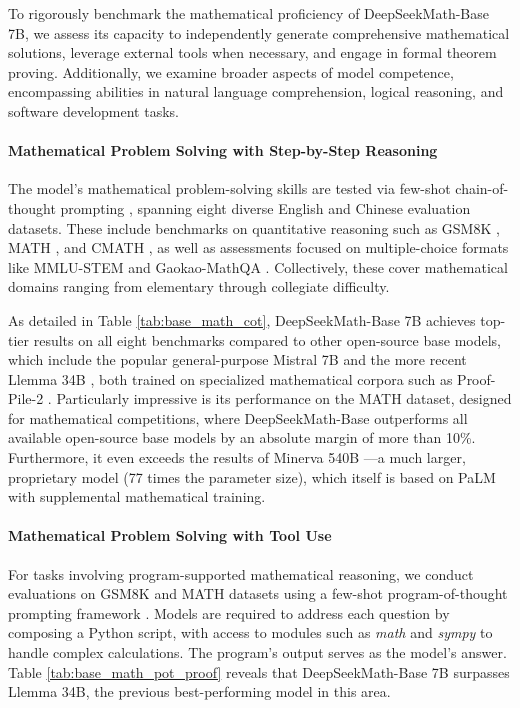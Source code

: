 To rigorously benchmark the mathematical proficiency of DeepSeekMath-Base 7B, we assess its capacity to independently generate comprehensive mathematical solutions, leverage external tools when necessary, and engage in formal theorem proving. Additionally, we examine broader aspects of model competence, encompassing abilities in natural language comprehension, logical reasoning, and software development tasks.

\paragraph{Mathematical Problem Solving with Step-by-Step Reasoning}

The model's mathematical problem-solving skills are tested via few-shot chain-of-thought prompting \citep{cot}, spanning eight diverse English and Chinese evaluation datasets. These include benchmarks on quantitative reasoning such as GSM8K \citep{gsm8k}, MATH \citep{MATH}, and CMATH \citep{wei2023cmath}, as well as assessments focused on multiple-choice formats like MMLU-STEM \citep{mmlu} and Gaokao-MathQA \citep{agieval}. Collectively, these cover mathematical domains ranging from elementary through collegiate difficulty.

As detailed in Table \ref{tab:base_math_cot}, DeepSeekMath-Base 7B achieves top-tier results on all eight benchmarks compared to other open-source base models, which include the popular general-purpose Mistral 7B \citep{mistral} and the more recent Llemma 34B \citep{llemma}, both trained on specialized mathematical corpora such as Proof-Pile-2 \citep{llemma}. Particularly impressive is its performance on the MATH dataset, designed for mathematical competitions, where DeepSeekMath-Base outperforms all available open-source base models by an absolute margin of more than 10\%. Furthermore, it even exceeds the results of Minerva 540B \citep{minerva}—a much larger, proprietary model (77 times the parameter size), which itself is based on PaLM \citep{palm} with supplemental mathematical training.

\paragraph{Mathematical Problem Solving with Tool Use} For tasks involving program-supported mathematical reasoning, we conduct evaluations on GSM8K and MATH datasets using a few-shot program-of-thought prompting framework \citep{pot,pal}. Models are required to address each question by composing a Python script, with access to modules such as \textit{math} and \textit{sympy} to handle complex calculations. The program’s output serves as the model's answer. Table \ref{tab:base_math_pot_proof} reveals that DeepSeekMath-Base 7B surpasses Llemma 34B, the previous best-performing model in this area.

